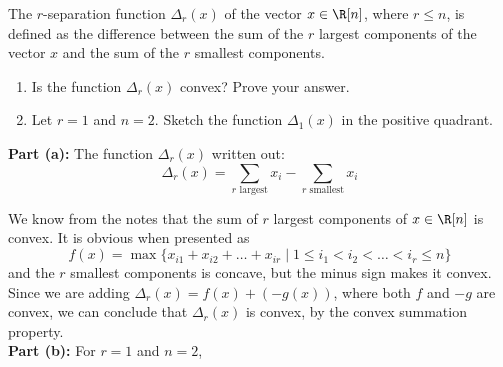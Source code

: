 \documentclass[11pt]{article}
\begin{document}
\pagebreak

\begin{homeworkProblem}
    The $r$-separation function $\Delta_r(x)$ of the vector $x \in \R[n]$, where $r \leq n$, is defined as the difference between the sum
    of the $r$ largest components of the vector $x$ and the sum of the $r$ smallest components.
    \begin{enumerate}[label=(\alph*), topsep=5pt, itemsep=2.5pt]
        \item Is the function $\Delta_r(x)$ convex? Prove your answer.
        \item Let $r = 1$ and $n = 2$. Sketch the function $\Delta_1(x)$ in the positive quadrant.
    \end{enumerate} \vspace{1\baselineskip}

    \solution

    \textbf{Part (a):} The function $\Delta_r(x)$ written out:
    \[
        \Delta_r(x) = \sum_{r \text{ largest}} x_i - \sum_{r \text{ smallest}} x_i
    \]

    We know from the notes that the sum of $r$ largest components of $x \in \R[n]$ is convex. It is obvious when presented as
    \[
        f(x) = \max \{x_{i1} + x_{i2} + \ldots + x_{ir} \mid 1 \leq i_1 < i_2 < \ldots < i_r \leq n\}
    \]
    and the $r$ smallest components is concave, but the minus sign makes it convex. \\

    Since we are adding $\Delta_r(x) = f(x) + (-g(x))$, where both $f$ and $-g$ are convex, we can conclude that $\Delta_r(x)$ is convex, by the convex summation property. \\

    \textbf{Part (b):} For $r = 1$ and $n = 2$,

    \begin{figure}[hbpt!]
        \centering
    \end{figure}

\end{homeworkProblem}
\end{document}
